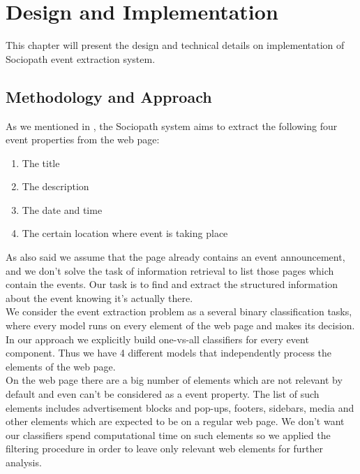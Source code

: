 \chapter{Design and Implementation}
\label{chap:design}
This chapter will present the design and technical details on implementation of Sociopath event extraction system. \\

\section{Methodology and Approach}
As we mentioned in , the Sociopath system aims to extract the following four event properties from the web page: 

\begin{enumerate}
    \item The title
    \item The description
    \item The date and time
    \item The certain location where event is taking place
\end{enumerate}

As also said we assume that the page already contains an event announcement, and we don't solve the task of information retrieval to list those pages which contain the events. Our task is to find and extract the structured information about the event knowing it's actually there.\\

We consider the event extraction problem as a several binary classification tasks, where every model runs on every element of the web page and makes its decision. In our approach we explicitly build one-vs-all classifiers for every event component. Thus we have 4 different models that independently process the elements of the web page. \\

On the web page there are a big number of elements which are not relevant by default and even can't be considered as a event property. The list of such elements includes advertisement blocks and pop-ups, footers, sidebars, media and other elements which are expected to be on a regular web page. We don't want our classifiers spend computational time on such elements so we applied the filtering procedure in order to leave only relevant web elements for further analysis.\\

